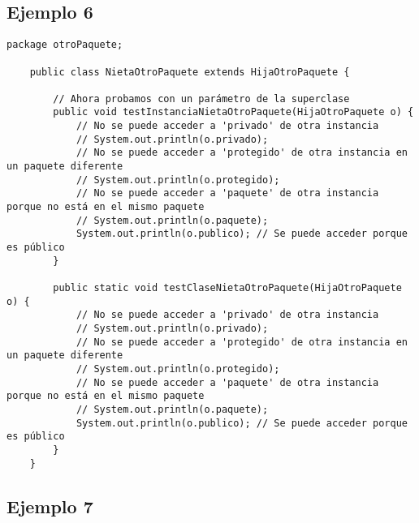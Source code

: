 \documentclass[a4paper,12pt]{article}
\begin{document}
\subsection{Ejemplo 6}
\begin{lstlisting}[style=customjava]
    package otroPaquete;
    
    public class NietaOtroPaquete extends HijaOtroPaquete {
    
        // Ahora probamos con un parámetro de la superclase
        public void testInstanciaNietaOtroPaquete(HijaOtroPaquete o) {
            // No se puede acceder a 'privado' de otra instancia
            // System.out.println(o.privado);
            // No se puede acceder a 'protegido' de otra instancia en un paquete diferente
            // System.out.println(o.protegido);
            // No se puede acceder a 'paquete' de otra instancia porque no está en el mismo paquete
            // System.out.println(o.paquete);
            System.out.println(o.publico); // Se puede acceder porque es público
        }
    
        public static void testClaseNietaOtroPaquete(HijaOtroPaquete o) {
            // No se puede acceder a 'privado' de otra instancia
            // System.out.println(o.privado);
            // No se puede acceder a 'protegido' de otra instancia en un paquete diferente
            // System.out.println(o.protegido);
            // No se puede acceder a 'paquete' de otra instancia porque no está en el mismo paquete
            // System.out.println(o.paquete);
            System.out.println(o.publico); // Se puede acceder porque es público
        }
    }
\end{lstlisting}

\subsection{Ejemplo 7}
\end{document}
